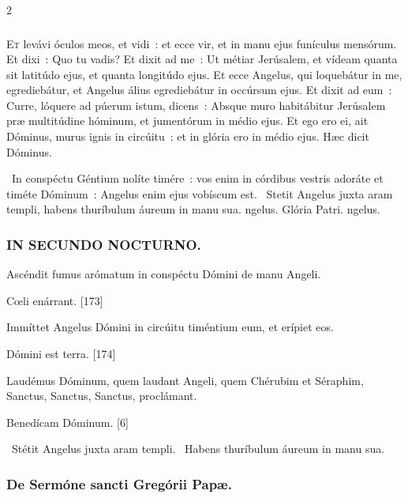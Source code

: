 \documentclass[9pt,twoside]{extarticle}
\begin{document}
\begin{multicols}{2}
{{{\subsubsection*{\center {}}
\lettrine{E}t levávi óculos meos, et vidi~: et ecce vir, et in manu ejus funículus mensórum.
Et dixi~: Quo tu vadis? Et dixit ad me~: Ut métiar Jerúsalem, et vídeam quanta sit latitúdo ejus, et quanta longitúdo ejus.
Et ecce Angelus, qui loquebátur in me, egrediebátur, et Angelus álius egrediebátur in occúrsum ejus.
Et dixit ad eum~: Curre, lóquere ad púerum istum, dicens~: Absque muro habitábitur Jerúsalem præ multitúdine hóminum, et jumentórum in médio ejus.
Et ego ero ei, ait Dóminus, murus ignis in circúitu~: et in glória ero in médio ejus. Hæc dicit Dóminus.

\begin{tightlist}{}
\item {}~In conspéctu Géntium nolíte timére~: vos enim in córdibus vestris adoráte et timéte Dóminum~: \textred{*} Angelus enim ejus vobíscum est. ~Stetit Angelus juxta aram templi, habens thuríbulum áureum in manu sua. ngelus. Glória Patri. ngelus.
\end{tightlist}

\subsubsection*{\center \textsc{IN SECUNDO NOCTURNO.}}
\begin{tightlist}{}
\item {} Ascéndit fumus arómatum in conspéctu Dómini de manu Angeli.
\item {} Cœli enárrant. [173]
\item {} Immíttet Angelus Dómini in circúitu timéntium eum, et erípiet eos.
\item {} Dómini est terra. [174]
\item {} Laudémus Dóminum, quem laudant Angeli, quem Chérubim et Séraphim, Sanctus, Sanctus, Sanctus, proclámant.
\item {} Benedícam Dóminum. [6]
\item {}~Stétit Angelus juxta aram templi. ~Habens thuríbulum áureum in manu sua.
\end{tightlist}

\subsubsection*{\center De Sermóne sancti Gregórii Papæ.}
}}}
\end{multicols}
\end{document}
